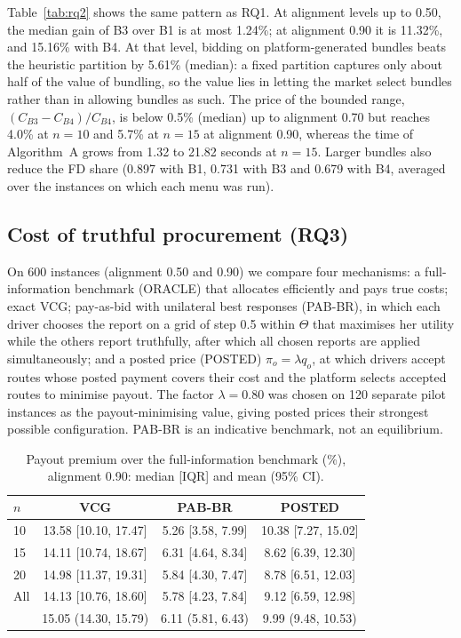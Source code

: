 \documentclass[review,12pt]{elsarticle}
\theoremstyle{definition}
\theoremstyle{remark}
\begin{document}
Table~\ref{tab:rq2} shows the same pattern as RQ1. At alignment levels up to
0.50, the median gain of B3 over B1 is at most 1.24\%; at alignment 0.90 it
is 11.32\%, and 15.16\% with B4. At that level, bidding on
platform-generated bundles beats the heuristic partition by 5.61\% (median):
a fixed partition captures only about half of the value of bundling, so the
value lies in letting the market select bundles rather than in allowing
bundles as such. The price of the bounded range, $(C_{B3}-C_{B4})/C_{B4}$, is
below 0.5\% (median) up to alignment 0.70 but reaches 4.0\% at $n=10$ and
5.7\% at $n=15$ at alignment 0.90, whereas the time of Algorithm~A grows from
1.32 to 21.82 seconds at $n=15$.
Larger bundles also reduce the FD share (0.897 with B1, 0.731 with B3 and
0.679 with B4, averaged over the instances on which each menu was run).

\subsection{Cost of truthful procurement (RQ3)}

On 600 instances (alignment 0.50 and 0.90) we compare four mechanisms: a
full-information benchmark (ORACLE) that allocates efficiently and pays true
costs; exact VCG; pay-as-bid with unilateral best responses (PAB-BR), in
which each driver chooses the report on a grid of step 0.5 within $\Theta$
that maximises her utility while the others report truthfully, after which
all chosen reports are applied simultaneously; and a posted price (POSTED)
$\pi_o=\lambda q_o$, at which drivers accept routes whose posted payment
covers their cost and the platform selects accepted routes to minimise
payout. The factor $\lambda=0.80$ was chosen on 120 separate pilot instances
as the payout-minimising value, giving posted prices their strongest
possible configuration. PAB-BR is an indicative benchmark, not an
equilibrium.

\begin{table}[t]
\centering
\caption{Payout premium over the full-information benchmark (\%), alignment 0.90: median [IQR] and mean (95\% CI).}
\label{tab:rq3}
\small
\begin{tabular}{lccc}
\toprule
$n$ & VCG & PAB-BR & POSTED\\
\midrule
10 & 13.58 [10.10, 17.47] & 5.26 [3.58, 7.99] & 10.38 [7.27, 15.02]\\
15 & 14.11 [10.74, 18.67] & 6.31 [4.64, 8.34] & 8.62 [6.39, 12.30]\\
20 & 14.98 [11.37, 19.31] & 5.84 [4.30, 7.47] & 8.78 [6.51, 12.03]\\
All & 14.13 [10.76, 18.60] & 5.78 [4.23, 7.84] & 9.12 [6.59, 12.98]\\
    & 15.05 (14.30, 15.79) & 6.11 (5.81, 6.43) & 9.99 (9.48, 10.53)\\
\bottomrule
\end{tabular}
\end{table}
\end{document}
